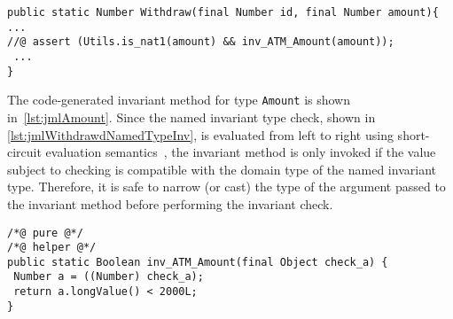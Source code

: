 \begin{lstlisting}[style=customJml,caption={Checking a named invariant
type of an operation parameter in
\ac{jml}.},label={lst:jmlWithdrawdNamedTypeInv}]
public static Number Withdraw(final Number id, final Number amount){
...
//@ assert (Utils.is_nat1(amount) && inv_ATM_Amount(amount));
 ...
}
\end{lstlisting}

The code-generated invariant method for type \texttt{Amount} is shown
in~\autoref{lst:jmlAmount}. Since the named invariant type check,
shown in \autoref{lst:jmlWithdrawdNamedTypeInv}, is evaluated from
left to right using short-circuit evaluation
semantics~\cite{McCarthy61}, the invariant method is only invoked if
the value subject to checking is compatible with the domain type of
the named invariant type. Therefore, it is safe to narrow (or cast)
the type of the argument passed to the invariant method before
performing the invariant check.

\begin{lstlisting}[style=customJml,caption={The named invariant type
method for \texttt{Amount}.},label={lst:jmlAmount}]
/*@ pure @*/
/*@ helper @*/
public static Boolean inv_ATM_Amount(final Object check_a) {
 Number a = ((Number) check_a);
 return a.longValue() < 2000L;
}
\end{lstlisting}

